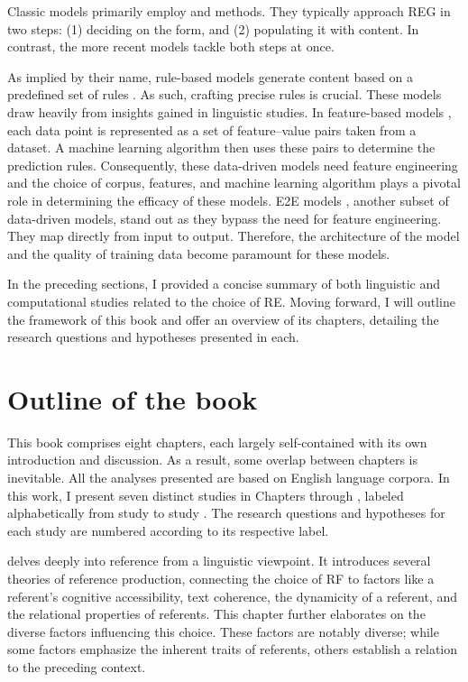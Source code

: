 Classic \context models primarily employ  and  methods. They typically approach REG in two steps: (1) deciding on the form, and (2) populating it with content. In contrast, the more recent  models tackle both steps at once. 

As implied by their name, rule-based models generate content based on a predefined set of rules \citep{mccoy1999generating,henschel2000pronominalization,poesio2004discourse}. As such, crafting precise rules is crucial. These models draw heavily from insights gained in linguistic studies. In feature-based models \citep{belz2010generating,greenbacker2009udel,kibrik2016referential}, each data point is represented as a set of feature--value pairs taken from a dataset.  A machine learning algorithm then uses these pairs to determine the prediction rules. Consequently, these data-driven models need feature engineering and the choice of corpus, features, and machine learning algorithm plays a pivotal role in determining the efficacy of these models. E2E models \citep{ferreira2018neuralreg,cao2019referring}, another subset of data-driven models, stand out as they bypass the need for feature engineering. They map directly from input to output. Therefore, the architecture of the model and the quality of training data become paramount for these models. 

In the preceding sections, I provided a concise summary of both linguistic and computational studies related to the choice of RE. Moving forward, I will outline the framework of this book and offer an overview of its chapters, detailing the research questions and hypotheses presented in each.

\section{Outline of the book}\label{sec:thisdiss}
This book comprises eight chapters, each largely self-contained with its own introduction and discussion. As a result, some overlap between chapters is inevitable. All the analyses presented are based on English language corpora. In this work, I present seven distinct studies in Chapters \4 through \7, labeled alphabetically from study \studA to study \studG. The research questions and hypotheses for each study are numbered according to its respective label.

 delves deeply into reference from a linguistic viewpoint. It introduces several theories of reference production, connecting the choice of RF to factors like a referent's cognitive accessibility, text coherence, the dynamicity of a referent, and the relational properties of referents. This chapter further elaborates on the diverse factors influencing this choice. These factors are notably diverse; while some factors emphasize the inherent traits of referents, others establish a relation to the preceding context.

